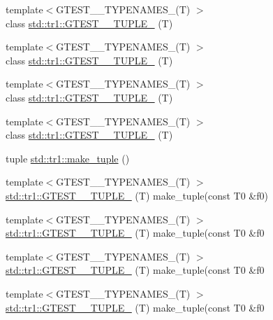\begin{DoxyCompactItemize}
{\footnotesize template$<$G\+T\+E\+S\+T\+\_\+\_\+\+T\+Y\+P\+E\+N\+A\+M\+E\+S\+\_\+(\+T) $>$ }\\class \mbox{\hyperlink{namespacestd_1_1tr1_a485b05fdbbcfcf7ad5e4234e17702268}{std\+::tr1\+::\+G\+T\+E\+S\+T\+\_\+\_\+\+T\+U\+P\+L\+E\+\_\+}} (T)
\item 
{\footnotesize template$<$G\+T\+E\+S\+T\+\_\+\_\+\+T\+Y\+P\+E\+N\+A\+M\+E\+S\+\_\+(\+T) $>$ }\\class \mbox{\hyperlink{namespacestd_1_1tr1_ab451b390a95ee0555d7a43b67ea348aa}{std\+::tr1\+::\+G\+T\+E\+S\+T\+\_\+\_\+\+T\+U\+P\+L\+E\+\_\+}} (T)
\item 
{\footnotesize template$<$G\+T\+E\+S\+T\+\_\+\_\+\+T\+Y\+P\+E\+N\+A\+M\+E\+S\+\_\+(\+T) $>$ }\\class \mbox{\hyperlink{namespacestd_1_1tr1_ab2b1c72e9db7436909d9ac011645f29d}{std\+::tr1\+::\+G\+T\+E\+S\+T\+\_\+\_\+\+T\+U\+P\+L\+E\+\_\+}} (T)
\item 
{\footnotesize template$<$G\+T\+E\+S\+T\+\_\+\_\+\+T\+Y\+P\+E\+N\+A\+M\+E\+S\+\_\+(\+T) $>$ }\\class \mbox{\hyperlink{namespacestd_1_1tr1_ab4f2c7d5458171bec6c4330fc5c7aba6}{std\+::tr1\+::\+G\+T\+E\+S\+T\+\_\+\_\+\+T\+U\+P\+L\+E\+\_\+}} (T)
\item 
tuple \mbox{\hyperlink{namespacestd_1_1tr1_af7e12a0f5b5791b5b7c49a5a17b85359}{std\+::tr1\+::make\+\_\+tuple}} ()
\item 
{\footnotesize template$<$G\+T\+E\+S\+T\+\_\+\_\+\+T\+Y\+P\+E\+N\+A\+M\+E\+S\+\_\+(\+T) $>$ }\\\mbox{\hyperlink{namespacestd_1_1tr1_a8b196fb65b7521a688f59c51418ab191}{std\+::tr1\+::\+G\+T\+E\+S\+T\+\_\+\_\+\+T\+U\+P\+L\+E\+\_\+}} (T) make\+\_\+tuple(const T0 \&f0)
\item 
{\footnotesize template$<$G\+T\+E\+S\+T\+\_\+\_\+\+T\+Y\+P\+E\+N\+A\+M\+E\+S\+\_\+(\+T) $>$ }\\\mbox{\hyperlink{namespacestd_1_1tr1_a90d9f0e7f95fa1c2093372d72493c3c1}{std\+::tr1\+::\+G\+T\+E\+S\+T\+\_\+\_\+\+T\+U\+P\+L\+E\+\_\+}} (T) make\+\_\+tuple(const T0 \&f0
\item 
{\footnotesize template$<$G\+T\+E\+S\+T\+\_\+\_\+\+T\+Y\+P\+E\+N\+A\+M\+E\+S\+\_\+(\+T) $>$ }\\\mbox{\hyperlink{namespacestd_1_1tr1_a4493d91e61718415264f7e72fea42930}{std\+::tr1\+::\+G\+T\+E\+S\+T\+\_\+\_\+\+T\+U\+P\+L\+E\+\_\+}} (T) make\+\_\+tuple(const T0 \&f0
\item 
{\footnotesize template$<$G\+T\+E\+S\+T\+\_\+\_\+\+T\+Y\+P\+E\+N\+A\+M\+E\+S\+\_\+(\+T) $>$ }\\\mbox{\hyperlink{namespacestd_1_1tr1_a4e57e6fab4219802275bd31821b31b58}{std\+::tr1\+::\+G\+T\+E\+S\+T\+\_\+\_\+\+T\+U\+P\+L\+E\+\_\+}} (T) make\+\_\+tuple(const T0 \&f0

\end{DoxyCompactItemize}
